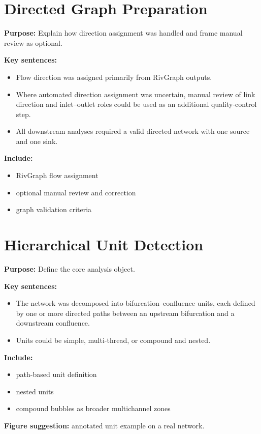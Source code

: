 \documentclass[11pt]{article}
\begin{document}
\section{Directed Graph Preparation}
\textbf{Purpose:} Explain how direction assignment was handled and frame manual review as optional.

\textbf{Key sentences:}
\begin{itemize}
\item Flow direction was assigned primarily from RivGraph outputs.
\item Where automated direction assignment was uncertain, manual review of link direction and inlet--outlet roles could be used as an additional quality-control step.
\item All downstream analyses required a valid directed network with one source and one sink.
\end{itemize}

\textbf{Include:}
\begin{itemize}
\item RivGraph flow assignment
\item optional manual review and correction
\item graph validation criteria
\end{itemize}

\section{Hierarchical Unit Detection}
\textbf{Purpose:} Define the core analysis object.

\textbf{Key sentences:}
\begin{itemize}
\item The network was decomposed into bifurcation--confluence units, each defined by one or more directed paths between an upstream bifurcation and a downstream confluence.
\item Units could be simple, multi-thread, or compound and nested.
\end{itemize}

\textbf{Include:}
\begin{itemize}
\item path-based unit definition
\item nested units
\item compound bubbles as broader multichannel zones
\end{itemize}

\textbf{Figure suggestion:} annotated unit example on a real network.
\end{document}
